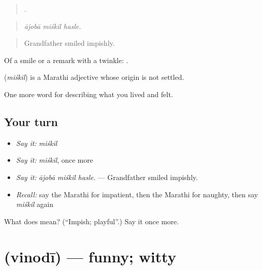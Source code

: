 \begin{quote}
  .
\end{quote}

\begin{quote}
\emph{ājobā miśkil hasle.}
\end{quote}

\begin{quote}
Grandfather smiled impishly.
\end{quote}

Of a smile or a remark with a twinkle:  .

\begin{cousinweb}
\textbf{} (\emph{miśkil}) is a Marathi adjective whose origin is not settled.
\end{cousinweb}

\begin{grammarlens}[title={What you've built}]
One more word for describing what you lived and felt.
\end{grammarlens}

\subsection*{Your turn}
\begin{itemize}
\raggedright
  \item \emph{Say it:} \emph{miśkil}
  \item \emph{Say it:} \emph{miśkil}, once more
  \item \emph{Say it:} \emph{ājobā miśkil hasle.} — Grandfather smiled impishly.
  \item \emph{Recall:} say the Marathi for impatient, then the Marathi for naughty, then say \emph{miśkil} again
\end{itemize}

\begin{tcolorbox}[breakable,colback=teal!4,colframe=teal!35!black,title={Before you move on}]
What does  mean? (\textquotedblleft{}Impish; playful\textquotedblright{}.) Say it once more.
\end{tcolorbox}
\section[\texorpdfstring{\mr{विनोदी} (vinodī)}{विनोदी (vinodī)}]{ (vinodī) — funny; witty}

\label{lesson:MR-C473-vinodi}



